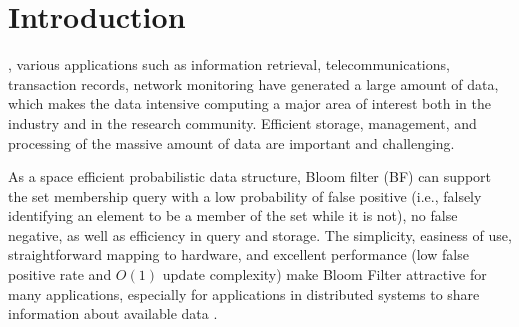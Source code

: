 \documentclass[10pt,journal,compsoc]{IEEEtran}
\begin{document}
\ifCLASSOPTIONcompsoc
{}
\else
\section{Introduction}
\label{sec:introduction}
\fi




%
%
%
%
, various applications such as information retrieval, telecommunications, transaction records, network monitoring have generated a large amount of data, which makes the data intensive computing a major area of interest both in the industry and in the research community. Efficient storage, management, and processing of the massive amount of data are important and challenging.

As a space efficient probabilistic data structure, Bloom filter (BF) \cite{bloom1970space} can support the set membership query with a low probability of false positive (i.e., falsely identifying an element to be a member of the set while it is not), no false negative, as well as efficiency in query and storage. The simplicity, easiness
of use, straightforward mapping to hardware, and excellent
performance (low false positive rate and $O(1)$ update complexity) make Bloom Filter attractive for many applications,
especially for applications in distributed systems to share
information about available data \cite{Broder2004,tarkoma2012theory}.
\end{document}
